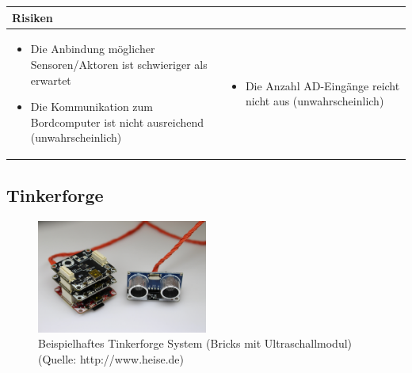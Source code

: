 \begin{table}[h]
\begin{tabular}{p{}p{}}


 \textbf{Risiken} & \\ \hline
	 
\begin{itemize}
\item Die Anbindung möglicher Sensoren/Aktoren ist schwieriger als erwartet
\item Die Kommunikation zum Bordcomputer ist nicht ausreichend (unwahrscheinlich)
\end{itemize}
&
\begin{itemize}
\item Die Anzahl AD-Eingänge reicht nicht aus (unwahrscheinlich)
\end{itemize}

 
\end{tabular}
\end{table}

\pagebreak


\subsection{Tinkerforge}
\begin{figure}[h]
	\centering
	\includegraphics[width=0.5\textwidth]{fig/Tinkerforge.png}
	\caption{Beispielhaftes Tinkerforge System (Bricks mit Ultraschallmodul) (Quelle: http://www.heise.de)}
\end{figure}

